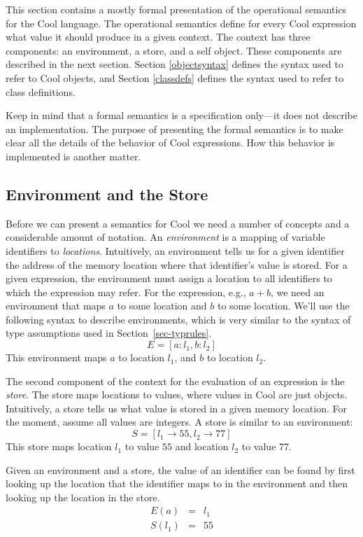 This section contains a mostly formal presentation of the operational
semantics for the Cool language. The operational semantics define for
every Cool expression what value it should produce in a given context.
The context has three components: an environment, a store, and a self
object. These components are described in the next section. Section
\ref{objectsyntax} defines the syntax used to refer to Cool
objects, and Section \ref{classdefs} defines the syntax used to refer to
class definitions.

Keep in mind that a formal semantics is a specification only---it does
not describe an implementation.  The purpose of presenting the formal
semantics is to make clear all the details of the behavior of Cool 
expressions.  How this behavior is implemented is another matter.

\subsection{Environment and the Store}

Before we can present a semantics for Cool we need a number
of concepts and a considerable amount of notation.
An {\em environment} is a mapping of variable identifiers to
{\em locations}.  Intuitively, an environment tells us for a given
identifier the address of the memory location where that identifier's
value is stored.  For a given expression, the environment must
assign a location to all identifiers to which the expression may refer.
 For the expression, e.g., $a + b$, we need an environment that maps
$a$ to some location and $b$ to some location. We'll use the following syntax
to describe environments, which is very similar to the syntax of type
assumptions used in Section~\ref{sec-typrules}.
\[
	E = [ a:l_1, b:l_2]
\]
This environment maps $a$ to location $l_1$, and $b$ to location
$l_2$.

The second component of the context for the evaluation of an
expression is the {\em store}. The store maps locations to values,
where values in Cool are just objects.  Intuitively, a store
tells us what value is stored in a given memory location.
For the moment, assume all values are integers.
A store is similar to an environment:
\[
	S = [ l_1\rightarrow 55, l_2\rightarrow 77 ]
\]
This store maps location $l_1$ to value $55$ and location $l_2$
to value $77$.

Given an environment and a store, the value of an
identifier can be found by first looking up the location that the identifier maps
to in the environment and then looking up the location in the store. 
\[
\begin{array}{rcl}
	E(a) &=& l_1 \\
	S(l_1) & = & 55
\end{array}
\]

